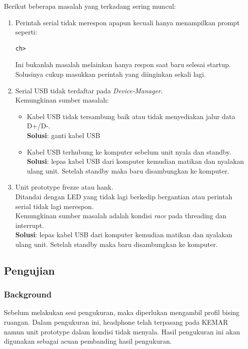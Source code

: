 \documentclass[12pt,]{article}
\begin{document}
	Berikut beberapa masalah yang terkadang sering muncul:
	\begin{enumerate}
		\item Perintah serial tidak merespon apapun kecuali hanya menampilkan prompt seperti:
		\begin{verbatim}
ch>
		\end{verbatim}
		Ini bukanlah masalah melainkan hanya respon saat baru selesai startup.
		Solusinya cukup masukkan perintah yang diinginkan sekali lagi.
		
		\item Serial USB tidak terdaftar pada \textit{Device-Manager}.\\
		Kemungkinan sumber masalah:
		\begin{itemize}
			\item Kabel USB tidak tersambung baik atau tidak menyediakan jalur data D+/D-.\\
			\textbf{Solusi}: ganti kabel USB
			
			\item Kabel USB terhubung ke komputer sebelum unit nyala dan standby.\\
			\textbf{Solusi}: lepas kabel USB dari komputer kemudian matikan dan nyalakan ulang unit.
			Setelah standby maka baru disambungkan ke komputer.
		\end{itemize}
		
		\item Unit prototype frezze atau hank.\\
		Ditandai dengan LED yang tidak lagi berkedip bergantian atau perintah serial tidak lagi merespon.\\
		Kemungkinan sumber masalah adalah kondisi \textit{race} pada threading dan interrupt.\\
		\textbf{Solusi}: lepas kabel USB dari komputer kemudian matikan dan nyalakan ulang unit.
		Setelah standby maka baru disambungkan ke komputer.
	\end{enumerate}
	
	\newpage
	\subsection{Pengujian}
	
	\subsubsection{Background}
	
	Sebelum melakukan sesi pengukuran, maka diperlukan mengambil profil bising ruangan.
	Dalam pengukuran ini, headphone telah terpasang pada KEMAR namun unit prototype dalam kondisi tidak menyala.
	Hasil pengukuran ini akan digunakan sebagai acuan pembanding hasil pengukuran.
	
\end{document}
